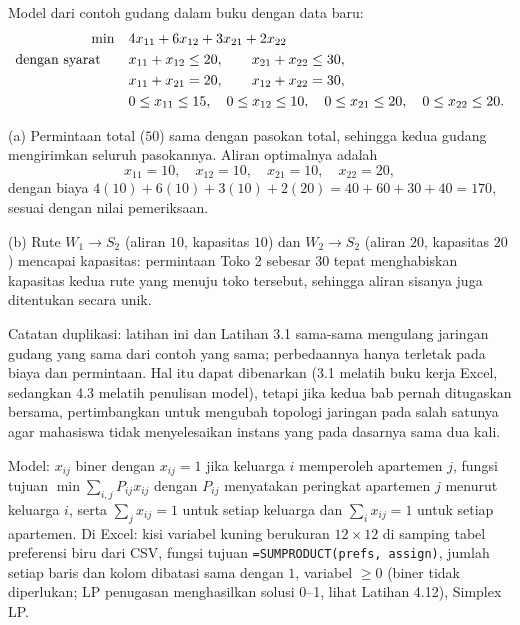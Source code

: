 Model dari contoh gudang dalam buku dengan data baru:
\begin{align*}
\min \quad & 4x_{11} + 6x_{12} + 3x_{21} + 2x_{22}\\
\mbox{dengan syarat}\quad \quad & x_{11} + x_{12} \leq 20, \qquad x_{21} + x_{22} \leq 30,\\
& x_{11} + x_{21} = 20, \qquad x_{12} + x_{22} = 30,\\
& 0 \leq x_{11} \leq 15, \quad 0 \leq x_{12} \leq 10, \quad 0 \leq x_{21} \leq 20, \quad 0 \leq x_{22} \leq 20.
\end{align*}

(a) Permintaan total ($50$) sama dengan pasokan total, sehingga kedua gudang mengirimkan seluruh pasokannya. Aliran optimalnya adalah
\[
x_{11} = 10, \quad x_{12} = 10, \quad x_{21} = 10, \quad x_{22} = 20,
\]
dengan biaya $4(10) + 6(10) + 3(10) + 2(20) = 40 + 60 + 30 + 40 = 170$, sesuai dengan nilai pemeriksaan.

(b) Rute $W_1 \to S_2$ (aliran $10$, kapasitas $10$) dan $W_2 \to S_2$ (aliran $20$, kapasitas $20$) mencapai kapasitas: permintaan Toko 2 sebesar $30$ tepat menghabiskan kapasitas kedua rute yang menuju toko tersebut, sehingga aliran sisanya juga ditentukan secara unik.

\begin{qaflag}
Catatan duplikasi: latihan ini dan Latihan 3.1 sama-sama mengulang jaringan gudang yang sama dari contoh yang sama; perbedaannya hanya terletak pada biaya dan permintaan. Hal itu dapat dibenarkan (3.1 melatih buku kerja Excel, sedangkan 4.3 melatih penulisan model), tetapi jika kedua bab pernah ditugaskan bersama, pertimbangkan untuk mengubah topologi jaringan pada salah satunya agar mahasiswa tidak menyelesaikan instans yang pada dasarnya sama dua kali.
\end{qaflag}


Model: $x_{ij}$ biner dengan $x_{ij} = 1$ jika keluarga $i$ memperoleh apartemen $j$, fungsi tujuan $\min \sum_{i,j} P_{ij} x_{ij}$ dengan $P_{ij}$ menyatakan peringkat apartemen $j$ menurut keluarga $i$, serta $\sum_j x_{ij} = 1$ untuk setiap keluarga dan $\sum_i x_{ij} = 1$ untuk setiap apartemen. Di Excel: kisi variabel kuning berukuran $12 \times 12$ di samping tabel preferensi biru dari CSV, fungsi tujuan \texttt{=SUMPRODUCT(prefs, assign)}, jumlah setiap baris dan kolom dibatasi sama dengan $1$, variabel $\geq 0$ (biner tidak diperlukan; LP penugasan menghasilkan solusi 0--1, lihat Latihan 4.12), Simplex LP.

